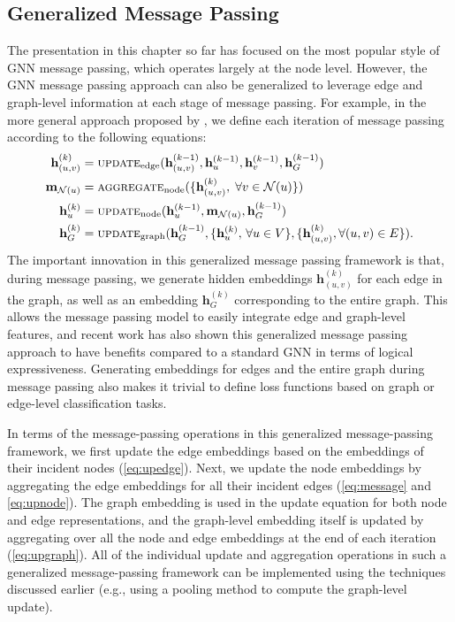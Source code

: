 \documentclass[10pt]{book}
\begin{document}
\subsection{Generalized Message Passing}

The presentation in this chapter so far has focused on the most popular style of GNN message passing, which operates largely at the node level. However, the GNN message passing approach can also be generalized to leverage edge and graph-level information at each stage of message passing. For example, in the more general approach proposed by \cite{battaglia2018relational}, we define each iteration of message passing according to the following equations:
\begin{align}
    \mathbf h^{(k)}_{(u,v)} &= \textsc{update}_\text{edge} (\mathbf h_{(u,v)}^{(k-1)}, \mathbf h_u^{(k-1)}, \mathbf h_v^{(k-1)}, \mathbf h_G^{(k-1)})
    \label{eq:upedge} \\
    \mathbf m_{\mathcal N(u)} &= \textsc{aggregate}_\text{node}(\{ \mathbf h_{(u,v)}^{(k)}, \; \forall v \in \mathcal N(u) \})
    \label{eq:message} \\
    \mathbf h^{(k)}_u &= \textsc{update}_\text{node} ( \mathbf h_u^{(k-1)}, \mathbf m_{\mathcal N(u)}, \mathbf h_G^{(k-1)})
    \label{eq:upnode} \\
    \mathbf h^{(k)}_G &= \textsc{update}_\text{graph}(\mathbf h_G^{( k-1)}, \{ \mathbf h_u^{(k)}, \, \forall u \in V\}, \{ \mathbf h_{(u,v)}^{(k)}, \forall (u, v) \in E\}).
    \label{eq:upgraph}
\end{align}
The important innovation in this generalized message passing framework is that, during message passing, we generate hidden embeddings $\mathbf h_{(u,v)}^{(k)}$ for each edge in the graph, as well as an embedding $\mathbf h_G^{(k)}$ corresponding to the entire graph. This allows the message passing model to easily integrate edge and graph-level features, and recent work has also shown this generalized message passing approach to have benefits compared to a standard GNN in terms of logical expressiveness. Generating embeddings for edges and the entire graph during message passing also makes it trivial to define loss functions based on graph or edge-level classification tasks.

In terms of the message-passing operations in this generalized message-passing framework, we first update the edge embeddings based on the embeddings of their incident nodes (\autoref{eq:upedge}). Next, we update the node embeddings by aggregating the edge embeddings for all their incident edges (\autoref{eq:message} and \ref{eq:upnode}). The graph embedding is used in the update equation for both node and edge representations, and the graph-level embedding itself is updated by aggregating over all the node and edge embeddings at the end of each iteration (\autoref{eq:upgraph}). All of the individual update and aggregation operations in such a generalized message-passing framework can be implemented using the
techniques discussed earlier (e.g., using a pooling method to compute the graph-level update).
\end{document}
